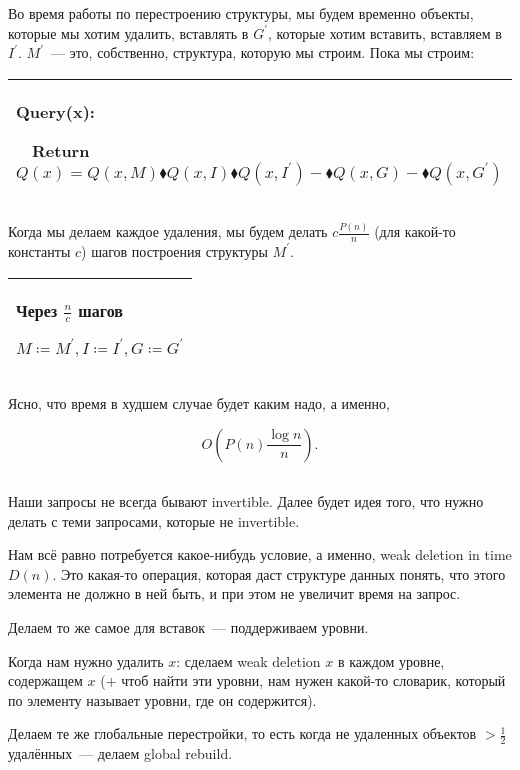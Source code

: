 Во время работы по перестроению структуры, мы будем временно объекты, которые мы хотим удалить, вставлять в $G^\prime$, которые хотим вставить, вставляем в $I^\prime$. $M^\prime$~--- это, собственно, структура, которую мы строим. Пока мы строим:


\begin{tabular}{|p{11cm}|}
    \hline
    Query(x):

    $\quad$Return $Q(x)=Q(x,M)\blacklozenge Q(x,I) \blacklozenge Q(x,I^\prime)-\blacklozenge Q(x,G)-\blacklozenge Q(x,G^\prime)$ \\
    \hline
\end{tabular}


Когда мы делаем каждое удаления, мы будем делать $c\frac{P(n)}{n}$ (для какой-то константы $c$) шагов построения структуры $M^\prime$.


\begin{tabular}{|p{4cm}|}
    \hline
    Через $\frac{n}{c}$ шагов

    $M \coloneqq M^\prime,I \coloneqq I^\prime,G \coloneqq G^\prime$ \\
    \hline
\end{tabular}


Ясно, что время в худшем случае будет каким надо, а именно,

\begin{equation*}
    O\left(P(n)\frac{\log n}{n} \right).
\end{equation*}

\subsection{}

Наши запросы не всегда бывают invertible. Далее будет идея того, что нужно делать с теми запросами, которые не invertible.

Нам всё равно потребуется какое-нибудь условие, а именно, weak deletion in time $D(n)$. Это какая-то операция, которая даст структуре данных понять, что этого элемента не должно в ней быть, и при этом не увеличит время на запрос.

Делаем то же самое для вставок~--- поддерживаем уровни.

Когда нам нужно удалить $x$: сделаем weak deletion $x$ в каждом уровне, содержащем $x$ (+ чтоб найти эти уровни, нам нужен какой-то словарик, который по элементу называет уровни, где он содержится).

Делаем те же глобальные перестройки, то есть когда не удаленных объектов $>\frac{1}{2}$ удалённых~--- делаем global rebuild.

